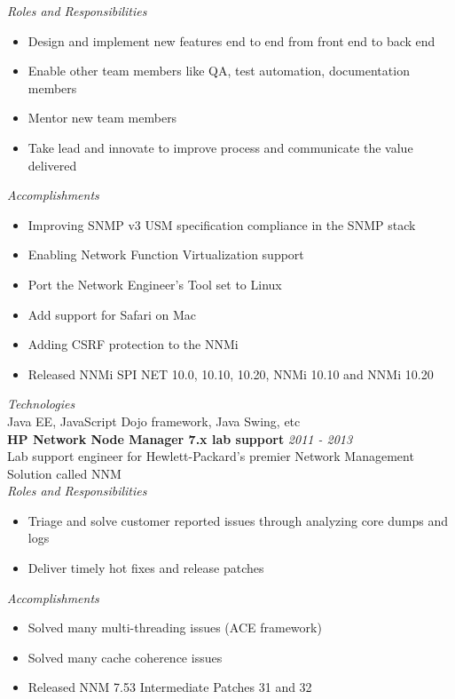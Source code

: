 \documentclass[line,margin]{res}
\begin{document}
\begin{resume}
{\it{Roles and Responsibilities}}\\
\begin{itemize}
\item Design and implement new features end to end from front end to back end
\item Enable other team members like QA, test automation, documentation members
\item Mentor new team members
\item Take lead and innovate to improve process and communicate the value delivered
\end{itemize}

{\it{Accomplishments}}\\
\begin{itemize}
\item Improving SNMP v3 USM specification compliance in the SNMP stack
\item Enabling Network Function Virtualization support
\item Port the Network Engineer's Tool set to Linux
\item Add support for Safari on Mac
\item Adding CSRF protection to the NNMi
\item Released NNMi SPI NET 10.0, 10.10, 10.20, NNMi 10.10 and NNMi 10.20
\end{itemize}

{\it{Technologies}}\\
Java EE, JavaScript Dojo framework, Java Swing, etc\\

{\bf HP Network Node Manager 7.x lab support} \hfill {\it{2011 - 2013}}\\
Lab support engineer for Hewlett-Packard's premier Network Management Solution called NNM\\

{\it{Roles and Responsibilities}}\\
\begin{itemize}
\item Triage and solve customer reported issues through analyzing core dumps and logs
\item Deliver timely hot fixes and release patches
\end{itemize}

{\it{Accomplishments}}\\
\begin{itemize}
\item Solved many multi-threading issues (ACE framework)
\item Solved many cache coherence issues
\item Released NNM 7.53 Intermediate Patches 31 and 32
\end{itemize}



\end{resume}
\end{document}
